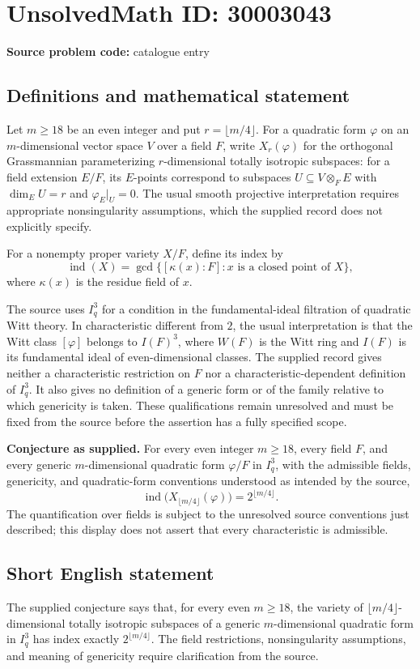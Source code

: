 \documentclass[11pt]{article}
\begin{document}
\section*{UnsolvedMath ID: 30003043}
\textbf{Source problem code:} catalogue entry
\subsection{Definitions and mathematical statement}
Let \(m\geq 18\) be an even integer and put \(r=\lfloor m/4\rfloor\). For a quadratic form \(\varphi\) on an \(m\)-dimensional vector space \(V\) over a field \(F\), write \(X_r(\varphi)\) for the orthogonal Grassmannian parameterizing \(r\)-dimensional totally isotropic subspaces: for a field extension \(E/F\), its \(E\)-points correspond to subspaces \(U\subseteq V\otimes_F E\) with \(\dim_E U=r\) and \(\varphi_E|_U=0\). The usual smooth projective interpretation requires appropriate nonsingularity assumptions, which the supplied record does not explicitly specify.

For a nonempty proper variety \(X/F\), define its index by
\[
\operatorname{ind}(X)=\gcd\{[\kappa(x):F]:x\text{ is a closed point of }X\},
\]
where \(\kappa(x)\) is the residue field of \(x\).

The source uses \(I_q^3\) for a condition in the fundamental-ideal filtration of quadratic Witt theory. In characteristic different from \(2\), the usual interpretation is that the Witt class \([\varphi]\) belongs to \(I(F)^3\), where \(W(F)\) is the Witt ring and \(I(F)\) is its fundamental ideal of even-dimensional classes. The supplied record gives neither a characteristic restriction on \(F\) nor a characteristic-dependent definition of \(I_q^3\). It also gives no definition of a generic form or of the family relative to which genericity is taken. These qualifications remain unresolved and must be fixed from the source before the assertion has a fully specified scope.

\textbf{Conjecture as supplied.} For every even integer \(m\geq18\), every field \(F\), and every generic \(m\)-dimensional quadratic form \(\varphi/F\) in \(I_q^3\), with the admissible fields, genericity, and quadratic-form conventions understood as intended by the source,
\[
\operatorname{ind}\bigl(X_{\lfloor m/4\rfloor}(\varphi)\bigr)
=2^{\lfloor m/4\rfloor}.
\]
The quantification over fields is subject to the unresolved source conventions just described; this display does not assert that every characteristic is admissible.
\subsection{Short English statement}
The supplied conjecture says that, for every even \(m\geq18\), the variety of \(\lfloor m/4\rfloor\)-dimensional totally isotropic subspaces of a generic \(m\)-dimensional quadratic form in \(I_q^3\) has index exactly \(2^{\lfloor m/4\rfloor}\). The field restrictions, nonsingularity assumptions, and meaning of genericity require clarification from the source.
\end{document}

